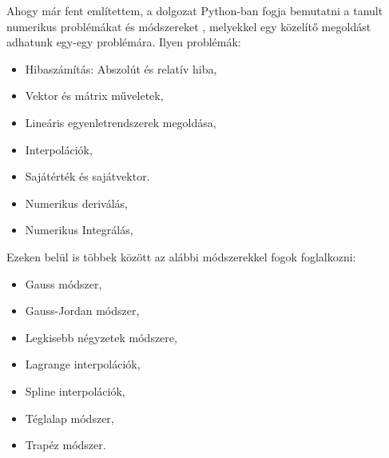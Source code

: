 
Ahogy már fent említettem, a dolgozat Python-ban fogja bemutatni a
tanult numerikus problémákat és módszereket \cite{matha}, melyekkel egy közelítő
megoldást adhatunk egy-egy problémára. Ilyen problémák:
\begin{itemize}
\item
  Hibaszámítás: Abszolút és relatív hiba,
\item
  Vektor és mátrix műveletek,
\item
  Lineáris egyenletrendszerek megoldása,
\item
  Interpolációk,
\item
  Sajátérték és sajátvektor.
\item
  Numerikus deriválás,
\item
  Numerikus Integrálás,
\end{itemize}
Ezeken belül is többek között az alábbi módszerekkel fogok foglalkozni:
\begin{itemize}
\item
  Gauss módszer,
\item
  Gauss-Jordan módszer,
\item
  Legkisebb négyzetek módszere,
\item
  Lagrange interpolációk,
\item
  Spline interpolációk,
\item
  Téglalap módszer,
\item
  Trapéz módszer.
\end{itemize}
